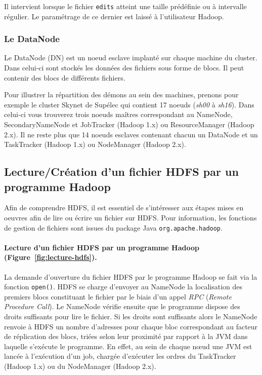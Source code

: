 \par Il intervient lorsque le fichier \texttt{edits} atteint une taille prédéfinie ou à intervalle régulier. Le paramétrage de ce dernier est laissé à l'utilisateur Hadoop.

\subsubsection{Le DataNode}
\label{sec:datanode}

\par Le DataNode (DN) est un noeud esclave implanté sur chaque machine du cluster. Dans celui-ci sont stockés les données des fichiers sous forme de blocs. Il peut contenir des blocs de différents fichiers.

\par Pour illustrer la répartition des démons au sein des machines, prenons pour exemple le cluster Skynet de Supélec qui contient 17 noeuds (\textit{sh00} à \textit{sh16}). Dans celui-ci vous trouverez trois noeuds maîtres correspondant au NameNode, SecondaryNameNode et JobTracker (Hadoop 1.x) ou ResourceManager (Hadoop 2.x). Il ne reste plus que 14 noeuds esclaves contenant chacun un DataNode et un TaskTracker (Hadoop 1.x) ou NodeManager (Hadoop 2.x).

\subsection{Lecture/Création d'un fichier HDFS par un programme Hadoop}
\label{sec:read-write-hdfs}

\par Afin de comprendre HDFS, il est essentiel de s'intéresser aux étapes mises en oeuvres afin de lire ou écrire un fichier sur HDFS. Pour information, les fonctions de gestion de fichiers sont issues du package Java \texttt{org.apache.hadoop}.

\paragraph{Lecture d'un fichier HDFS par un programme Hadoop (Figure~\ref{fig:lecture-hdfs}).}La demande d'ouverture du fichier HDFS par le programme Hadoop se fait via la fonction \texttt{open()}. HDFS se charge d'envoyer au NameNode la localisation des premiers blocs constituant le fichier par le biais d'un appel \textit{RPC} (\textit{Remote Procedure Call}). Le NameNode vérifie ensuite que le programme dispose des droits suffisants pour lire le fichier. Si les droits sont suffisants alors le NameNode renvoie à HDFS un nombre d'adresses pour chaque bloc correspondant au facteur de réplication des blocs, triées selon leur proximité par rapport à la JVM dans laquelle s'exécute le programme. En effet, au sein de chaque n\oe{}ud une JVM est lancée à l'exécution d'un job, chargée d'exécuter les ordres du TaskTracker (Hadoop 1.x) ou du NodeManager (Hadoop 2.x). 

